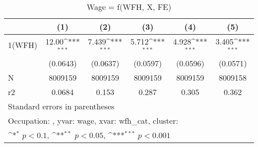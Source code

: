 \begin{table}[htbp]\centering
\def\sym#1{\ifmmode^{#1}\else\(^{#1}\)\fi}
\caption{Wage = f(WFH, X, FE)}
\begin{tabular}{l*{5}{c}}
\hline\hline
                    &\multicolumn{1}{c}{(1)}         &\multicolumn{1}{c}{(2)}         &\multicolumn{1}{c}{(3)}         &\multicolumn{1}{c}{(4)}         &\multicolumn{1}{c}{(5)}         \\
\hline
1(WFH)              &       12.00\sym{***}&       7.439\sym{***}&       5.712\sym{***}&       4.928\sym{***}&       3.405\sym{***}\\
                    &    (0.0643)         &    (0.0637)         &    (0.0597)         &    (0.0596)         &    (0.0571)         \\
\hline
N                   &     8009159         &     8009159         &     8009159         &     8009159         &     8009158         \\
r2                  &      0.0684         &       0.153         &       0.287         &       0.305         &       0.362         \\
\hline\hline
\multicolumn{6}{l}{\footnotesize Standard errors in parentheses}\\
\multicolumn{6}{l}{\footnotesize Occupation: , yvar: wage, xvar: wfh\_cat, cluster: }\\
\multicolumn{6}{l}{\footnotesize \sym{*} \(p<0.1\), \sym{**} \(p<0.05\), \sym{***} \(p<0.001\)}\\
\end{tabular}
\end{table}
